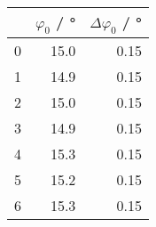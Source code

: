 \begin{tabular}{lrr}
\toprule
{} &  $\varphi_0$ / \si{\degree} &  $\Delta \varphi_0$ / \si{\degree} \\
\midrule
0 &                        15.0 &                               0.15 \\
1 &                        14.9 &                               0.15 \\
2 &                        15.0 &                               0.15 \\
3 &                        14.9 &                               0.15 \\
4 &                        15.3 &                               0.15 \\
5 &                        15.2 &                               0.15 \\
6 &                        15.3 &                               0.15 \\
\bottomrule
\end{tabular}
